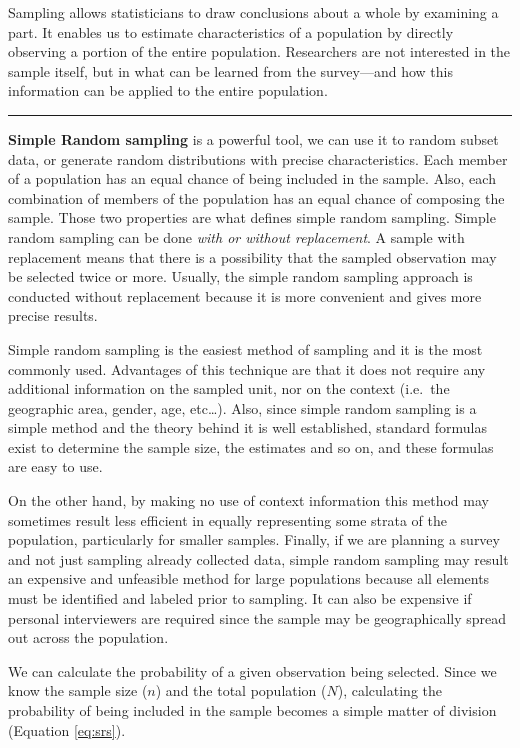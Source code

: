 \documentclass[
]{svmono}
\begin{document}
Sampling allows statisticians to draw conclusions about a whole by
examining a part. It enables us to estimate characteristics of a
population by directly observing a portion of the entire population.
Researchers are not interested in the sample itself, but in what can be
learned from the survey---and how this information can be applied to the
entire population.

\begin{center}\rule{0.5\linewidth}{0.5pt}\end{center}

\textbf{Simple Random sampling} is a powerful tool, we can use it to random
subset data, or generate random distributions with precise
characteristics. Each member of a population has an equal chance of
being included in the sample. Also, each combination of members of the
population has an equal chance of composing the sample. Those two
properties are what defines simple random sampling. Simple random
sampling can be done \emph{with or without replacement}. A sample with
replacement means that there is a possibility that the sampled
observation may be selected twice or more. Usually, the simple random
sampling approach is conducted without replacement because it is more
convenient and gives more precise results.

Simple random sampling is the easiest method of sampling and it is the
most commonly used. Advantages of this technique are that it does not
require any additional information on the sampled unit, nor on the
context (i.e.~the geographic area, gender, age, etc\ldots). Also, since
simple random sampling is a simple method and the theory behind it is
well established, standard formulas exist to determine the sample size,
the estimates and so on, and these formulas are easy to use.

On the other hand, by making no use of context information this method
may sometimes result less efficient in equally representing some strata
of the population, particularly for smaller samples. Finally, if we are
planning a survey and not just sampling already collected data, simple
random sampling may result an expensive and unfeasible method for large
populations because all elements must be identified and labeled prior to
sampling. It can also be expensive if personal interviewers are required
since the sample may be geographically spread out across the population.

We can calculate the probability of a given observation being selected.
Since we know the sample size (\(n\)) and the total population (\(N\)),
calculating the probability of being included in the sample becomes a
simple matter of division (Equation \eqref{eq:srs}).
\end{document}
